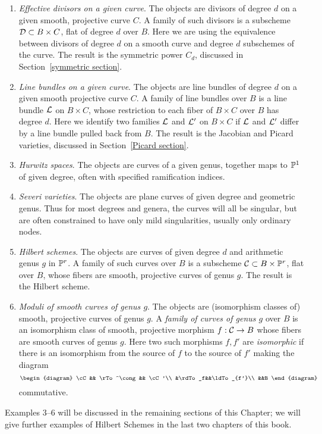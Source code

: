 \begin{enumerate}\label{list of moduli problems}

\item \emph{Effective divisors on a given curve}. The objects are divisors of degree $d$ on a given smooth, projective curve $C$. A family of such divisors is a subscheme ${\cal D} \subset B \times C$, flat of degree $d$ over $B$. Here we are using
the equivalence between divisors of degree $d$ on a smooth curve and degree $d$ subschemes of the curve. The result is the symmetric power $C_d$, discussed in Section~\ref{symmetric section}.

\item \emph{Line bundles on a given curve}. The objects are line bundles of degree $d$ on a given smooth projective curve $C$. A family of line bundles over $B$ is a line bundle ${\mathcal L}$ on $B \times C$, whose restriction to each fiber of $B \times C$ over $B$ has degree $d$. Here we identify two families ${\mathcal L}$ and ${\mathcal L}'$ on $B \times C$ if ${\mathcal L}$ and ${\mathcal L}'$ differ by a line
bundle pulled back from $B$. The result is the Jacobian and Picard varieties, discussed in Section~\ref{Picard section}.

\item \emph{Hurwitz spaces}. The objects are curves of a given genus, together maps to ${\mathbb P}^1$ of given degree, often with specified ramification indices. 

\item \emph{Severi varieties}. The objects are plane curves
of given degree and geometric genus. Thus for most degrees and genera,
the curves will all be singular, but are often
constrained to have only mild singularities, usually only ordinary nodes.

\item \emph{Hilbert schemes}. The objects are curves of given degree $d$ and arithmetic genus $g$ in ${\mathbb P}^r$.  A family of such curves over $B$ is a subscheme ${\cal C} \subset B \times {\mathbb P}^r$, flat over $B$,  whose fibers are smooth, projective curves of genus $g$. The result is the Hilbert scheme.

\item \emph{Moduli of smooth curves of genus $g$}. The objects are (isomorphism classes of) smooth, projective curves of genus $g$. A \emph{family of curves of genus $g$} over $B$ is an isomorphism class of smooth, projective morphism $f : {\cal C} \to B$ whose fibers are  smooth curves of genus $g$. Here two such morphisms $f, f'$
are \emph{isomorphic} if there is an isomorphism from the source of $f$ to the source
of $f'$ making the diagram
$$
\begin{diagram}
\cC && \rTo^\cong && \cC'\\
&\rdTo_f&&\ldTo_{f'}\\
&&B
\end{diagram}
$$
commutative.
\end{enumerate}
Examples 3--6 will be discussed in the remaining sections of this Chapter; we will give further examples of Hilbert Schemes in the last two chapters of this book.

